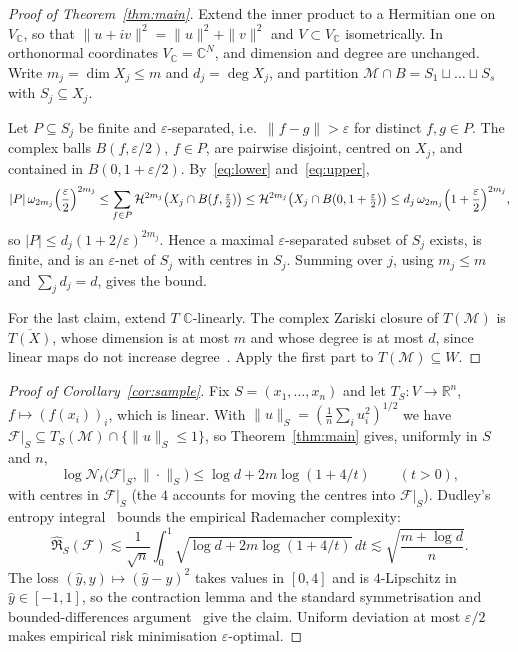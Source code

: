 \documentclass[11pt]{article}
\newcommand{\R}{\mathbb{R}}
\newcommand{\C}{\mathbb{C}}
\newcommand{\cM}{\mathcal{M}}
\newcommand{\cN}{\mathcal{N}}
\newcommand{\cF}{\mathcal{F}}
\newcommand{\cH}{\mathcal{H}}
\begin{document}
\begin{proof}[Proof of Theorem~\ref{thm:main}]
Extend the inner product to a Hermitian one on $V_\C$, so that
$\|u+iv\|^2=\|u\|^2+\|v\|^2$ and $V\subset V_\C$ isometrically. In orthonormal
coordinates $V_\C=\C^N$, and dimension and degree are unchanged. Write
$m_j=\dim X_j\le m$ and $d_j=\deg X_j$, and partition
$\cM\cap B=S_1\sqcup\dots\sqcup S_s$ with $S_j\subseteq X_j$.

Let $P\subseteq S_j$ be finite and $\varepsilon$-separated, i.e.\
$\|f-g\|>\varepsilon$ for distinct $f,g\in P$. The complex balls
$B(f,\varepsilon/2)$, $f\in P$, are pairwise disjoint, centred on $X_j$, and
contained in $B(0,1+\varepsilon/2)$. By~\eqref{eq:lower} and~\eqref{eq:upper},
\[
  |P|\,\omega_{2m_j}\Bigl(\frac{\varepsilon}{2}\Bigr)^{2m_j}
  \le\sum_{f\in P}\cH^{2m_j}\bigl(X_j\cap B(f,\tfrac{\varepsilon}{2})\bigr)
  \le\cH^{2m_j}\bigl(X_j\cap B(0,1+\tfrac{\varepsilon}{2})\bigr)
  \le d_j\,\omega_{2m_j}\Bigl(1+\frac{\varepsilon}{2}\Bigr)^{2m_j},
\]
so $|P|\le d_j(1+2/\varepsilon)^{2m_j}$. Hence a maximal $\varepsilon$-separated
subset of $S_j$ exists, is finite, and is an $\varepsilon$-net of $S_j$ with
centres in $S_j$. Summing over $j$, using $m_j\le m$ and $\sum_j d_j=d$, gives
the bound.

For the last claim, extend $T$ $\C$-linearly. The complex Zariski closure of
$T(\cM)$ is $\overline{T(X)}$, whose dimension is at most $m$ and whose degree
is at most $d$, since linear maps do not increase degree~\cite{He83}. Apply the
first part to $T(\cM)\subseteq W$.
\end{proof}

\begin{proof}[Proof of Corollary~\ref{cor:sample}]
Fix $S=(x_1,\dots,x_n)$ and let $T_S\colon V\to\R^n$, $f\mapsto(f(x_i))_i$,
which is linear. With $\|u\|_S=(\frac1n\sum_i u_i^2)^{1/2}$ we have
$\cF|_S\subseteq T_S(\cM)\cap\{\|u\|_S\le1\}$, so Theorem~\ref{thm:main} gives,
uniformly in $S$ and $n$,
\[
  \log\cN_t\bigl(\cF|_S,\|\cdot\|_S\bigr)\le\log d+2m\log(1+4/t)
  \qquad(t>0),
\]
with centres in $\cF|_S$ (the $4$ accounts for moving the centres into
$\cF|_S$). Dudley's entropy integral~\cite{Du67} bounds the empirical
Rademacher complexity:
\[
  \widehat{\mathfrak R}_S(\cF)\lesssim\frac{1}{\sqrt n}\int_0^1
  \sqrt{\log d+2m\log(1+4/t)}\,dt\lesssim\sqrt{\frac{m+\log d}{n}}.
\]
The loss $(\hat y,y)\mapsto(\hat y-y)^2$ takes values in $[0,4]$ and is
$4$-Lipschitz in $\hat y\in[-1,1]$, so the contraction lemma and the standard
symmetrisation and bounded-differences argument~\cite{BM02} give the claim.
Uniform deviation at most $\varepsilon/2$ makes empirical risk minimisation
$\varepsilon$-optimal.
\end{proof}
\end{document}
